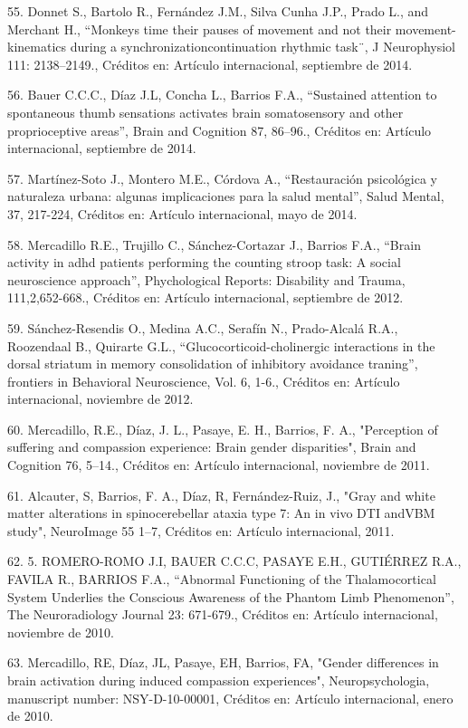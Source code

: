 55. Donnet S., Bartolo R., Fernández J.M., Silva Cunha J.P., Prado L., and Merchant H., “Monkeys time their pauses of movement 
and not their movement-kinematics during a synchronizationcontinuation rhythmic task¨, J Neurophysiol 111: 2138–2149., Créditos 
en: Artículo internacional, septiembre de 2014.

56. Bauer C.C.C., Díaz J.L, Concha L., Barrios F.A., “Sustained attention to spontaneous thumb sensations activates brain 
somatosensory and other proprioceptive areas”, Brain and Cognition 87, 86–96., Créditos en: Artículo internacional, septiembre 
de 2014.

57. Martínez-Soto J., Montero M.E., Córdova A., “Restauración psicológica y naturaleza urbana: algunas implicaciones para la 
salud mental”, Salud Mental, 37, 217-224, Créditos en: Artículo internacional, mayo de 2014.

58. Mercadillo R.E., Trujillo C., Sánchez-Cortazar J., Barrios F.A., “Brain activity in adhd patients performing the counting 
stroop task: A social neuroscience approach”, Phychological Reports: Disability and Trauma, 111,2,652-668., Créditos en: 
Artículo internacional, septiembre de 2012.

59. Sánchez-Resendis O., Medina A.C., Serafín N., Prado-Alcalá R.A., Roozendaal B., Quirarte G.L., “Glucocorticoid-cholinergic 
interactions in the dorsal striatum in memory consolidation of inhibitory avoidance traning”, frontiers in Behavioral 
Neuroscience, Vol. 6, 1-6., Créditos en: Artículo internacional, noviembre de 2012.

60. Mercadillo, R.E., Díaz, J. L., Pasaye, E. H., Barrios, F. A., "Perception of suffering and compassion experience: Brain 
gender disparities", Brain and Cognition 76, 5–14., Créditos en: Artículo internacional, noviembre de 2011.

61. Alcauter, S, Barrios, F. A., Díaz, R, Fernández-Ruiz, J., "Gray and white matter alterations in spinocerebellar ataxia type 
7: An in vivo DTI andVBM study", NeuroImage 55 1–7, Créditos en: Artículo internacional, 2011.

62. 5. ROMERO-ROMO J.I, BAUER C.C.C, PASAYE E.H., GUTIÉRREZ R.A., FAVILA R., BARRIOS F.A., “Abnormal Functioning of the 
Thalamocortical System Underlies the Conscious Awareness of the Phantom Limb Phenomenon”, The Neuroradiology Journal 23: 
671-679., Créditos en: Artículo internacional, noviembre de 2010.

63. Mercadillo, RE, Díaz, JL, Pasaye, EH, Barrios, FA, "Gender differences in brain activation during induced compassion 
experiences", Neuropsychologia, manuscript number: NSY-D-10-00001, Créditos en: Artículo internacional, enero de 2010.

